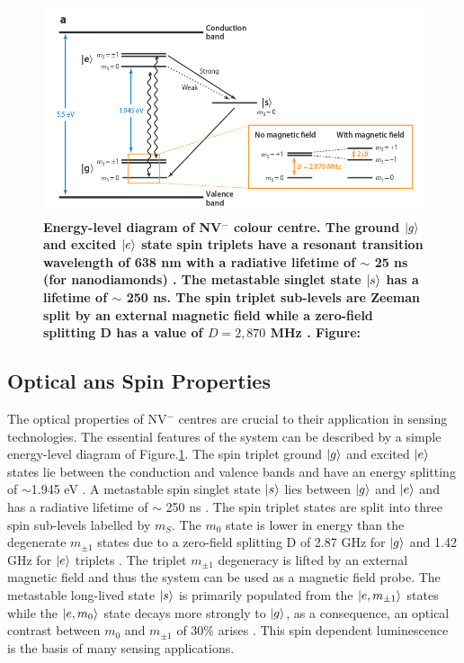 \documentclass[10pt]{article}
\begin{document}
\begin{multicols}{2}
\begin{figure}[h]
  \includegraphics[width=0.8\linewidth]{energy_level_diagram.png}
	  \caption{\textbf{Energy-level diagram of NV$^-$ colour centre. The ground $\ket{g}$ and excited $\ket{e}$ state spin triplets have a resonant transition wavelength of 638 nm with a radiative lifetime of $\sim$ 25 ns (for nanodiamonds) \cite{doherty2013nitrogen}. The metastable singlet state $\ket{s}$ has a lifetime of $\sim$ 250 ns. The spin triplet sub-levels are Zeeman split by an external magnetic field while a zero-field splitting D has a value of $D=2,870$ MHz \cite{schirhagl2014nitrogen,doherty2013nitrogen}. Figure:\cite{schirhagl2014nitrogen}}}
  \label{fig:energy_level}
\end{figure}


\subsection{Optical ans Spin Properties}
The optical properties of NV$^-$ centres are crucial to their application in sensing technologies. The essential features of the system can be described by a simple energy-level diagram of Figure.\ref{fig:energy_level}. The spin triplet ground $\ket{g}$ and excited $\ket{e}$ states lie between the conduction and valence bands and have an energy splitting of $\sim$1.945 eV \cite{schirhagl2014nitrogen}. A metastable spin singlet state $\ket{s}$ lies between $\ket{g}$ and $\ket{e}$ and has a radiative lifetime of $\sim$ 250 ns \cite{schirhagl2014nitrogen}. The spin triplet states are split into three spin sub-levels labelled by $m_S$. The $m_0$ state is lower in energy than the degenerate $m_{\pm1}$ states due to a zero-field splitting D of 2.87 GHz for $\ket{g}$ and 1.42 GHz for $\ket{e}$ triplets \cite{doherty2013nitrogen}. The triplet $m_{\pm1}$ degeneracy is lifted by an external magnetic field and thus the system can be used as a magnetic field probe. The metastable long-lived state $\ket{s}$ is primarily populated from the $\ket{e,m_{\pm1}}$ states while the $\ket{e,m_0}$ state decays more strongly to $\ket{g}$, as a consequence, an optical contrast between $m_0$ and $m_{\pm1}$ of 30\% arises \cite{schirhagl2014nitrogen}. This spin dependent luminescence is the basis of many sensing applications. 


\end{multicols}
\end{document}
